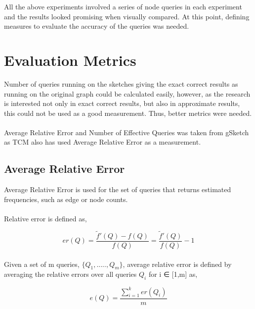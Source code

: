 \documentclass[12pt]{report}
\numberwithin{figure}{section}
\numberwithin{table}{section}
\begin{document}
All the above experiments involved a series of node queries in each experiment and the results looked promising when visually compared. At this point, defining measures to evaluate the accuracy of the queries was needed. 

\section{Evaluation Metrics}
Number of queries running on the sketches giving the exact correct results as running on the original graph could be calculated easily, however, as the research is interested not only in exact correct results, but also in approximate results, this could not be used as a good measurement. Thus, better metrics were needed.

\paragraph{}

Average Relative Error and Number of Effective Queries was taken from gSketch\cite{gSketch} as TCM also has used Average Relative Error as a measurement. 

\subsection{Average Relative Error}
Average Relative Error is used for the set of queries that returns estimated frequencies, such as edge or node counts.

\paragraph{}

Relative error is defined as, 

\begin{equation}
er(Q) =  \frac{\tilde{f}'(Q) - f(Q)}{f(Q)} = \frac{\tilde{f}'(Q)}{f(Q)} -1 
\end{equation}

\paragraph{}

Given a set of m queries, $\{ Q_1 , ....., Q_m \}$, average relative error is defined by averaging the relative errors over all queries $Q_i$ for i ∈ [1,m] as,

\begin{equation}
e(Q) =  \frac{\sum_{i=1}^{k} er(Q_i)}{m}
\end{equation}
\end{document}
